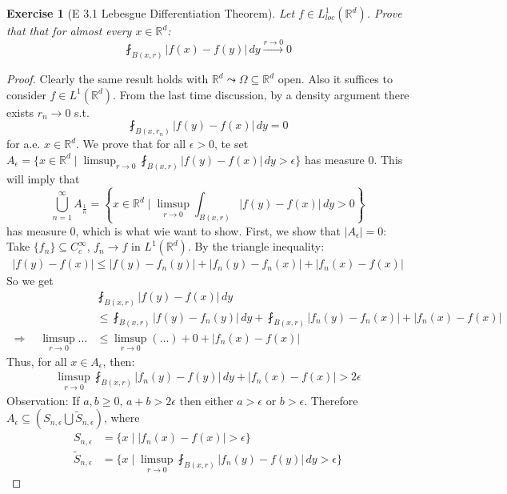 \documentclass{report}
\theoremstyle{tommy}
\newtheorem{ex}[defn]{Exercise}
\begin{document}
  \begin{ex}[E 3.1 Lebesgue Differentiation Theorem]
    Let \(f \in L_{loc}^1(\mathbb{R}^d)\). Prove that that for almost every \(x \in \mathbb{R}^d\):
    \[\fint_{B(x,r)} |f(x) - f(y)| \, dy \xrightarrow{r \to 0} 0\]
  \end{ex}

  \begin{proof}
    Clearly the same result holds with \(\mathbb{R}^d \leadsto \Omega \subseteq \mathbb{R}^d\) open. Also it suffices to consider \(f \in L^1(\mathbb{R}^d)\). From the last time discussion, by a density argument there exists \(r_n \to 0\) s.t.
    \[\fint_{B(x, r_n)} |f(y) - f(x)| \, dy = 0\]
    for a.e. \(x \in \mathbb{R}^d\). We prove that for all \(\epsilon > 0\), te set \(A_\epsilon = \{x \in \mathbb{R}^d \mid \limsup_{r \to 0} \fint_{B(x,r)} |f(y) - f(x)| \, dy > \epsilon\}\) has measure \(0\). This will imply that 
    \[\bigcup_{n = 1}^\infty A_{\frac{1}{n}} = \left\{x \in \mathbb{R}^d \mid \limsup_{r \to 0} \int_{B(x,r)} |f(y) - f(x)| \, dy > 0\right\}\] has measure \(0\), which is what wie want to show. First, we show that \(|A_\epsilon| = 0\): Take \(\{f_n\} \subseteq C_c^\infty\), \(f_n \to f\) in \(L^1(\mathbb{R}^d)\). By the triangle inequality:
    \begin{align*}
      |f(y) - f(x)| \le |f(y) - f_n(y)| + |f_n(y) - f_n(x)| + |f_n(x) - f(x)|
    \end{align*}
    So we get 
    \begin{align*}
      &\fint_{B(x,r)} |f(y) - f(x)| \, dy \\
      \quad &\le \fint_{B(x,r)}|f(y) - f_n(y)| \, dy + \fint_{B(x, r)} |f_n(y) - f_n(x)| + |f_n(x) - f(x)| \\
      \Rightarrow \quad \limsup_{r \to 0} ... &\le \limsup_{r \to 0} (\dots) +0 + |f_n(x) - f(x)|
    \end{align*}
    Thus, for all \(x \in A_\epsilon\), then:
    \begin{align*}
      \limsup_{r \to 0} \fint_{B(x, r)} |f_n(y) - f(y)| \, dy + |f_n(x) - f(x)| > 2 \epsilon
    \end{align*}
    Observation: If \(a, b \ge 0\), \(a + b > 2 \epsilon\) then either \(a > \epsilon\) or \(b > \epsilon\). Therefore \(A_\epsilon \subseteq \left(S_{n, \epsilon} \bigcup \tilde S_{n, \epsilon}\right)\), where
    \begin{align*}
      S_{n, \epsilon} &= \{x \mid |f_n(x) - f(x)| > \epsilon\} \\
      \tilde S_{n, \epsilon} &= \{x \mid \limsup_{r \to 0} \fint_{B(x,r)} |f_n(y) - f(y)| \, dy > \epsilon\}

\end{align*}
\end{proof}
\end{document}
